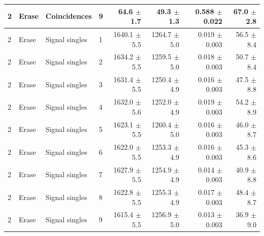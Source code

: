 \begin{tabular}{llllrrrr}
2 & Erase & Coincidences & 9 & 64.6 \ensuremath{\pm} 1.7 & 49.3 \ensuremath{\pm} 1.3 & 0.588 \ensuremath{\pm} 0.022 & 67.0 \ensuremath{\pm} 2.8 \\
\midrule
2 & Erase & Signal singles & 1 & 1640.1 \ensuremath{\pm} 5.5 & 1264.7 \ensuremath{\pm} 5.0 & 0.019 \ensuremath{\pm} 0.003 & 56.5 \ensuremath{\pm} 8.4 \\
2 & Erase & Signal singles & 2 & 1634.2 \ensuremath{\pm} 5.5 & 1259.5 \ensuremath{\pm} 5.0 & 0.018 \ensuremath{\pm} 0.003 & 50.7 \ensuremath{\pm} 8.4 \\
2 & Erase & Signal singles & 3 & 1631.4 \ensuremath{\pm} 5.5 & 1250.4 \ensuremath{\pm} 4.9 & 0.016 \ensuremath{\pm} 0.003 & 47.5 \ensuremath{\pm} 8.8 \\
2 & Erase & Signal singles & 4 & 1632.0 \ensuremath{\pm} 5.6 & 1252.0 \ensuremath{\pm} 4.9 & 0.019 \ensuremath{\pm} 0.003 & 54.2 \ensuremath{\pm} 8.9 \\
2 & Erase & Signal singles & 5 & 1623.1 \ensuremath{\pm} 5.5 & 1260.4 \ensuremath{\pm} 5.0 & 0.016 \ensuremath{\pm} 0.003 & 46.0 \ensuremath{\pm} 8.7 \\
2 & Erase & Signal singles & 6 & 1622.0 \ensuremath{\pm} 5.5 & 1253.3 \ensuremath{\pm} 4.9 & 0.016 \ensuremath{\pm} 0.003 & 45.3 \ensuremath{\pm} 8.6 \\
2 & Erase & Signal singles & 7 & 1627.9 \ensuremath{\pm} 5.5 & 1254.9 \ensuremath{\pm} 4.9 & 0.014 \ensuremath{\pm} 0.003 & 40.9 \ensuremath{\pm} 8.8 \\
2 & Erase & Signal singles & 8 & 1622.8 \ensuremath{\pm} 5.5 & 1255.3 \ensuremath{\pm} 4.9 & 0.017 \ensuremath{\pm} 0.003 & 48.4 \ensuremath{\pm} 8.7 \\
2 & Erase & Signal singles & 9 & 1615.4 \ensuremath{\pm} 5.5 & 1256.9 \ensuremath{\pm} 5.0 & 0.013 \ensuremath{\pm} 0.003 & 36.9 \ensuremath{\pm} 9.0 \\
\bottomrule
\end{tabular}
